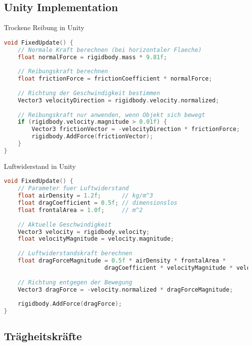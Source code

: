 \subsection{Unity Implementation}

\begin{code}{Trockene Reibung in Unity}
\begin{lstlisting}[language=C, style=basesmol]
void FixedUpdate() {
    // Normale Kraft berechnen (bei horizontaler Flaeche)
    float normalForce = rigidbody.mass * 9.81f;
    
    // Reibungskraft berechnen
    float frictionForce = frictionCoefficient * normalForce;
    
    // Richtung der Geschwindigkeit bestimmen
    Vector3 velocityDirection = rigidbody.velocity.normalized;
    
    // Reibungskraft nur anwenden, wenn Objekt sich bewegt
    if (rigidbody.velocity.magnitude > 0.01f) {
        Vector3 frictionVector = -velocityDirection * frictionForce;
        rigidbody.AddForce(frictionVector);
    }
}
\end{lstlisting}
\end{code}

\begin{code}{Luftwiderstand in Unity}
\begin{lstlisting}[language=C, style=basesmol]
void FixedUpdate() {
    // Parameter fuer Luftwiderstand
    float airDensity = 1.2f;      // kg/m^3
    float dragCoefficient = 0.5f; // dimensionslos
    float frontalArea = 1.0f;     // m^2
    
    // Aktuelle Geschwindigkeit
    Vector3 velocity = rigidbody.velocity;
    float velocityMagnitude = velocity.magnitude;
    
    // Luftwiderstandskraft berechnen
    float dragForceMagnitude = 0.5f * airDensity * frontalArea * 
                             dragCoefficient * velocityMagnitude * velocityMagnitude;
    
    // Richtung entgegen der Bewegung
    Vector3 dragForce = -velocity.normalized * dragForceMagnitude;
    
    rigidbody.AddForce(dragForce);
}
\end{lstlisting}
\end{code}

\subsection{Trägheitskräfte}

